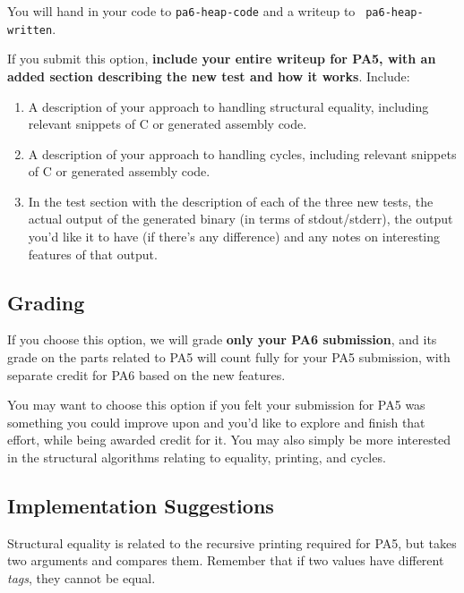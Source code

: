 \documentclass[10pt, oneside]{article}
\begin{document}
You will hand in your code to {\tt pa6-heap-code} and a writeup to {\tt
pa6-heap-written}.

If you submit this option, {\bf include your entire writeup for PA5, with an
added section describing the new test and how it works}. Include:

\begin{enumerate}

\item A description of your approach to handling structural equality,
including relevant snippets of C or generated assembly code.

\item A description of your approach to handling cycles, including relevant
snippets of C or generated assembly code.

\item In the test section with the description of each of the three new
tests, the actual output of the generated binary (in terms of stdout/stderr),
the output you’d like it to have (if there’s any difference) and any notes on
interesting features of that output.

\end{enumerate}



\subsection*{Grading}

If you choose this option, we will grade {\bf only your PA6 submission}, and
its grade on the parts related to PA5 will count fully for your PA5
submission, with separate credit for PA6 based on the new features.

You may want to choose this option if you felt your submission for PA5 was
something you could improve upon and you'd like to explore and finish that
effort, while being awarded credit for it. You may also simply be more
interested in the structural algorithms relating to equality, printing, and
cycles.

\subsection*{Implementation Suggestions}

Structural equality is related to the recursive printing required for PA5,
but takes two arguments and compares them. Remember that if two values have
different {\it tags}, they cannot be equal.
\end{document}
